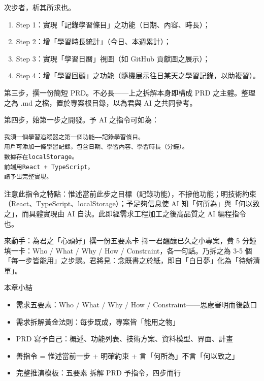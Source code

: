 次步者，析其所求也。

\begin{enumerate}
  \item Step 1：實現「記錄學習條目」之功能（日期、內容、時長）；
  \item Step 2：增「學習時長統計」（今日、本週累計）；
  \item Step 3：實現「學習日曆」視圖（如 GitHub 貢獻圖之展示）；
  \item Step 4：增「學習回顧」之功能（隨機展示往日某天之學習記錄，以助複習）。
\end{enumerate}

第三步，撰一份簡短 PRD。不必長——上之拆解本身即構成 PRD 之主體。整理之為 .md 之檔，置於專案根目錄，以為君與 AI 之共同參考。

第四步，始第一步之開發。予 AI 之指令可如為：

\begin{lstlisting}
我須一個學習追蹤器之第一個功能——記錄學習條目。
用戶可添加一條學習記錄，包含日期、學習內容、學習時長（分鐘）。
數據存在localStorage。
前端用React + TypeScript。
請予出完整實現。
\end{lstlisting}

注意此指令之特點：惟述當前此步之目標（記錄功能），不摻他功能；明技術約束（React、TypeScript、localStorage）；予足夠信息使 AI 知「何所為」與「何以致之」，而具體實現由 AI 自決。此即經需求工程加工之後高品質之 AI 編程指令也。

\begin{tcbpractice}{來動手：為君之「心頭好」撰一份五要素卡}
擇一君醞釀已久之小專案，費 5 分鐘填一卡：Who / What / Why / How / Constraint，各一句話。乃拆之為 3-5 個「每一步皆能用」之步驟。君將見：念既書之於紙，即自「白日夢」化為「待辦清單」。

\end{tcbpractice}

\begin{tcbsummary}{本章小結}
\begin{itemize}
  \item 需求五要素：Who / What / Why / How / Constraint——思慮審明而後啟口
  \item 需求拆解黃金法則：每步既成，專案皆「能用之物」
  \item PRD 寫予自己：概述、功能列表、技術方案、資料模型、界面、計畫
  \item 善指令 = 惟述當前一步 + 明確約束 + 言「何所為」不言「何以致之」
  \item 完整推演模板：五要素 拆解 PRD 予指令，四步而行
\end{itemize}

\end{tcbsummary}
